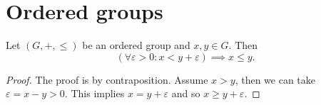 \section{Ordered groups}

\begin{lemma}
Let $(G,+,\leq)$ be an ordered group and $x,y\in G$. Then
\[ (\forall \varepsilon > 0: x< y+\varepsilon) \implies x\leq y. \]
\end{lemma}
\begin{proof}
The proof is by contraposition. Assume $x>y$, then we can take $\varepsilon = x-y>0$. This implies $x = y+\varepsilon$ and so $x \geq y+\varepsilon$. 
\end{proof}